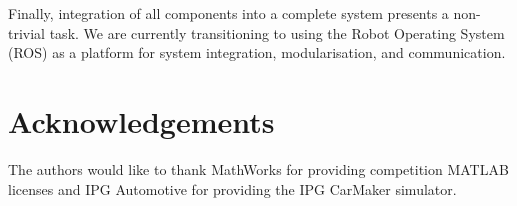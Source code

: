 \documentclass[a4paper, 10pt, conference]{ieeeconf}      %
\begin{document}
Finally, integration of all components into a complete system presents a
non-trivial task. We are currently transitioning to using the Robot
Operating System (ROS) as a platform for system integration, modularisation,
and communication.

\section*{Acknowledgements}
The authors would like to thank MathWorks for providing competition MATLAB
licenses and IPG Automotive for providing the IPG CarMaker simulator.


% 

\begin{acronym}
\end{acronym}
\end{document}

